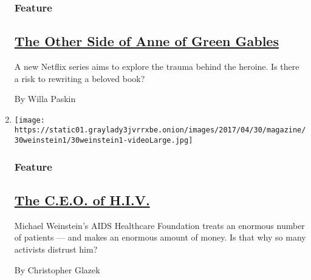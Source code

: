 \begin{enumerate}
  \hypertarget{feature-2}{%
  \subsubsection{Feature}\label{feature-2}}

  \hypertarget{the-other-side-of-anne-of-green-gables}{%
  \subsection{\texorpdfstring{\href{/2017/04/27/magazine/the-other-side-of-anne-of-green-gables.html}{The
  Other Side of Anne of Green
  Gables}}{The Other Side of Anne of Green Gables}}\label{the-other-side-of-anne-of-green-gables}}

  A new Netflix series aims to explore the trauma behind the heroine. Is
  there a risk to rewriting a beloved book?

  By Willa Paskin
\item
  \texttt{[image: https://static01.graylady3jvrrxbe.onion/images/2017/04/30/magazine/30weinstein1/30weinstein1-videoLarge.jpg]}

  \hypertarget{feature-3}{%
  \subsubsection{Feature}\label{feature-3}}

  \hypertarget{the-ceo-of-hiv}{%
  \subsection{\texorpdfstring{\href{/2017/04/26/magazine/the-ceo-of-hiv.html}{The
  C.E.O. of H.I.V.}}{The C.E.O. of H.I.V.}}\label{the-ceo-of-hiv}}

  Michael Weinstein's AIDS Healthcare Foundation treats an enormous
  number of patients --- and makes an enormous amount of money. Is that
  why so many activists distrust him?

  By Christopher Glazek
\end{enumerate}

